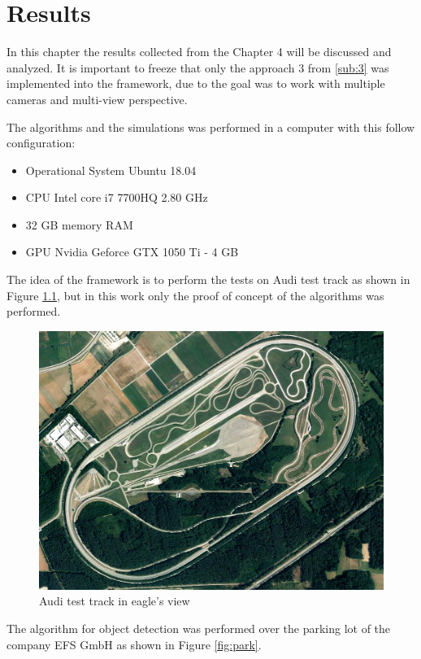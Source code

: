 \chapter{Results}
\label{capitulo5}

In this chapter the results collected from the Chapter 4 will be discussed and analyzed. It is important to freeze that only the approach 3 from \ref{sub:3} was implemented into the framework, due to the goal was to work with multiple cameras and multi-view perspective.

The algorithms and the simulations was performed in a computer with this follow configuration:

\begin{itemize}
    \item Operational System Ubuntu 18.04
    \item CPU Intel core i7 7700HQ 2.80 GHz
    \item 32 GB memory RAM
    \item GPU Nvidia Geforce GTX 1050 Ti - 4 GB
\end{itemize}


The idea of the framework is to perform the tests on Audi test track as shown in Figure \ref{fig:test_track}, but in this work only the proof of concept of the algorithms was performed. 

\begin{figure}[H]
\centering
\includegraphics[scale=0.3]{imagens/testtrack.jpg}
\caption{Audi test track in eagle's view}
\label{fig:test_track}
\end{figure}


The algorithm for object detection was performed over the parking lot of the company EFS GmbH as shown in Figure \ref{fig:park}.


